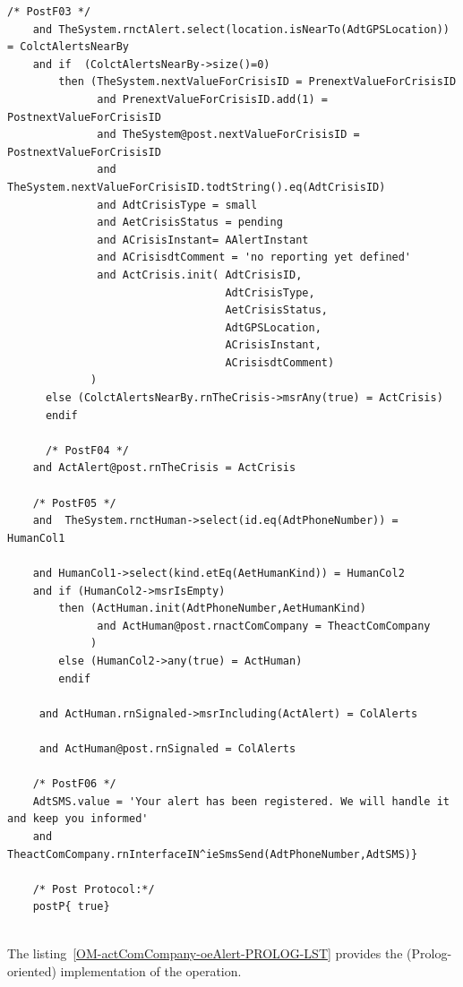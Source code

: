 \begin{lstlisting}[style=MessirStyle,firstnumber=auto,captionpos=b,caption={\msrmessir (MCL-oriented) specification of the operation \emph{oeAlert}.},label=OM-actComCompany-oeAlert-MCL-LST]
	  /* PostF03 */
	and TheSystem.rnctAlert.select(location.isNearTo(AdtGPSLocation)) = ColctAlertsNearBy
	and if  (ColctAlertsNearBy->size()=0)
	    then (TheSystem.nextValueForCrisisID = PrenextValueForCrisisID
	          and PrenextValueForCrisisID.add(1) = PostnextValueForCrisisID
	          and TheSystem@post.nextValueForCrisisID = PostnextValueForCrisisID
	          and TheSystem.nextValueForCrisisID.todtString().eq(AdtCrisisID)
	          and AdtCrisisType = small
	          and AetCrisisStatus = pending
	          and ACrisisInstant= AAlertInstant
	          and ACrisisdtComment = 'no reporting yet defined'
	          and ActCrisis.init( AdtCrisisID,
	                              AdtCrisisType,
	                              AetCrisisStatus,
	                              AdtGPSLocation,
	                              ACrisisInstant,
	                              ACrisisdtComment)
	         )
	  else (ColctAlertsNearBy.rnTheCrisis->msrAny(true) = ActCrisis)
	  endif
	
	  /* PostF04 */
	and ActAlert@post.rnTheCrisis = ActCrisis
	      
	/* PostF05 */
	and  TheSystem.rnctHuman->select(id.eq(AdtPhoneNumber)) = HumanCol1
	
	and HumanCol1->select(kind.etEq(AetHumanKind)) = HumanCol2
	and if (HumanCol2->msrIsEmpty)
	    then (ActHuman.init(AdtPhoneNumber,AetHumanKind)
	          and ActHuman@post.rnactComCompany = TheactComCompany
	         )
	    else (HumanCol2->any(true) = ActHuman)
	    endif
	    
	 and ActHuman.rnSignaled->msrIncluding(ActAlert) = ColAlerts
	 
	 and ActHuman@post.rnSignaled = ColAlerts
	
	/* PostF06 */
	AdtSMS.value = 'Your alert has been registered. We will handle it and keep you informed'
	and TheactComCompany.rnInterfaceIN^ieSmsSend(AdtPhoneNumber,AdtSMS)}
	
	/* Post Protocol:*/ 
	postP{ true}
	
	\end{lstlisting}
	\normalsize 
	
	
	
	
	
	\vspace{1cm}
	The listing~\ref{OM-actComCompany-oeAlert-PROLOG-LST} provides the \msrmessir (Prolog-oriented) implementation of the operation.
	
